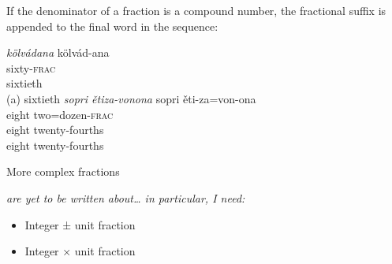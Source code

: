 \documentclass[grammar]{subfiles}
\begin{document}
	If the denominator of a fraction is a compound number, the fractional suffix is appended to the final word in the sequence:

	\begin{exe}
		\ex
		\begin{xlist}
			\ex \textit{kölvádana}
			\glll kölvád-ana\\
			sixty\textsc{-frac}\\
			sixtieth\\
			\glt (a) sixtieth
			\ex \textit{sopri ětiza-vonona}
			\glll sopri ěti-za=von-ona\\
			eight two=dozen\textsc{-frac}\\
			eight twenty-fourths\\
			\glt eight twenty-fourths
		\end{xlist}
	\end{exe}


	More complex fractions {\em are yet to be written about… in particular, I need:
		\begin{itemize}
			\item Integer ± unit fraction
			\item Integer × unit fraction
		\end{itemize}
	}


	
\end{document}
